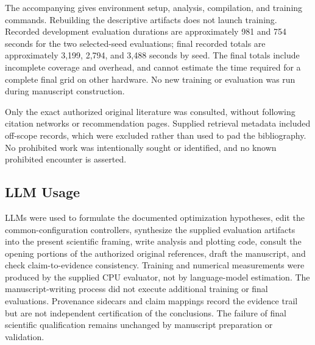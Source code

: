\documentclass{article}
\begin{document}
The accompanying  gives environment setup, analysis, compilation, and training commands. Rebuilding the descriptive artifacts does not launch training. Recorded development evaluation durations are approximately 981 and 754 seconds for the two selected-seed evaluations; final recorded totals are approximately 3,199, 2,794, and 3,488 seconds by seed. The final totals include incomplete coverage and overhead, and cannot estimate the time required for a complete final grid on other hardware. No new training or evaluation was run during manuscript construction.

Only the exact authorized original literature was consulted, without following citation networks or recommendation pages. Supplied retrieval metadata included off-scope records, which were excluded rather than used to pad the bibliography. No prohibited work was intentionally sought or identified, and no known prohibited encounter is asserted.

\subsection{LLM Usage}
LLMs were used to formulate the documented optimization hypotheses, edit the common-configuration controllers, synthesize the supplied evaluation artifacts into the present scientific framing, write analysis and plotting code, consult the opening portions of the authorized original references, draft the manuscript, and check claim-to-evidence consistency. Training and numerical measurements were produced by the supplied CPU evaluator, not by language-model estimation. The manuscript-writing process did not execute additional training or final evaluations. Provenance sidecars and claim mappings record the evidence trail but are not independent certification of the conclusions. The failure of final scientific qualification remains unchanged by manuscript preparation or validation.
\end{document}
